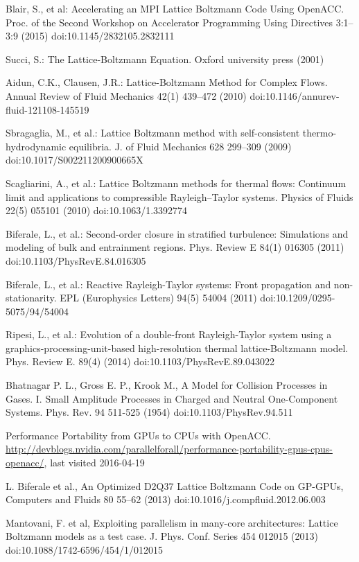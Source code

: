 \documentclass[times]{cpeauth}
\begin{document}
\begin{thebibliography}{10}
Blair, S., et al:
Accelerating an MPI Lattice Boltzmann Code Using OpenACC.
Proc. of the Second Workshop on Accelerator Programming Using Directives 3:1--3:9 (2015) 
doi:10.1145/2832105.2832111

Succi, S.:
The Lattice-Boltzmann Equation.
Oxford university press (2001) 

Aidun, C.K., Clausen, J.R.:
Lattice-Boltzmann Method for Complex Flows.
Annual Review of Fluid Mechanics 42(1) 439--472 (2010) 
doi:10.1146/annurev-fluid-121108-145519

Sbragaglia, M., et al.:
Lattice Boltzmann method with self-consistent thermo-hydrodynamic equilibria.
J. of Fluid Mechanics 628 299--309 (2009) 
doi:10.1017/S002211200900665X

Scagliarini, A., et al.:
Lattice Boltzmann methods for thermal flows: Continuum limit and applications to compressible Rayleigh--Taylor systems.
Physics of Fluids 22(5) 055101 (2010) 
doi:10.1063/1.3392774

Biferale, L., et al.:
Second-order closure in stratified turbulence: Simulations and modeling of bulk and entrainment regions.
Phys. Review E 84(1) 016305 (2011) 
doi:10.1103/PhysRevE.84.016305

Biferale, L., et al.:
Reactive Rayleigh-Taylor systems: Front propagation and non-stationarity.
EPL (Europhysics Letters) 94(5) 54004 (2011) 
doi:10.1209/0295-5075/94/54004

Ripesi, L., et al.:
Evolution of a double-front Rayleigh-Taylor system using a graphics-processing-unit-based high-resolution thermal lattice-Boltzmann model. 
Phys. Review E. 89(4) (2014) 
doi:10.1103/PhysRevE.89.043022

 Bhatnagar P. L., Gross E. P., Krook M., 
A Model for Collision Processes in Gases. I. Small Amplitude Processes in Charged and Neutral One-Component Systems. 
Phys. Rev. 94 511-525 (1954) 
doi:10.1103/PhysRev.94.511

Performance Portability from GPUs to CPUs with OpenACC.
\url{http://devblogs.nvidia.com/parallelforall/performance-portability-gpus-cpus-openacc/}, last visited 2016-04-19

L. Biferale et al., 
{An Optimized D2Q37 Lattice Boltzmann Code on GP-GPUs},
Computers and Fluids 80 55--62 (2013) 
doi:10.1016/j.compfluid.2012.06.003

Mantovani, F. et al,
Exploiting parallelism in many-core architectures: Lattice Boltzmann models as a test case. 
J. Phys. Conf. Series 454 012015 (2013) 
doi:10.1088/1742-6596/454/1/012015


\end{thebibliography}
\end{document}
